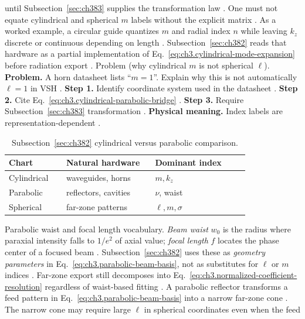 until Subsection~\ref{sec:ch383} supplies the transformation law \cite{hansen1988}. One must not equate cylindrical and
spherical \(m\) labels without the explicit matrix \cite{stratton1941}.
As a worked example, a circular guide quantizes \(m\) and radial index \(n\) while leaving \(k_{z}\) discrete or continuous depending on length
\cite{jackson1999}. Subsection~\ref{sec:ch382} reads that hardware as a partial implementation of
Eq.~\eqref{eq:ch3.cylindrical-mode-expansion} before radiation export \cite{stratton1941}.
Problem (why cylindrical \(m\) is not spherical \(\ell\)). \textbf{Problem.} A horn datasheet lists ``\(m=1\)''. Explain why this is not automatically \(\ell=1\) in VSH
\cite{harrington2001}.
\textbf{Step 1.} Identify coordinate system used in the datasheet \cite{stratton1941}.
\textbf{Step 2.} Cite Eq.~\eqref{eq:ch3.cylindrical-parabolic-bridge} \cite{hansen1988}.
\textbf{Step 3.} Require Subsection~\ref{sec:ch383} transformation \cite{harrington2001}.
\textbf{Physical meaning.} Index labels are representation-dependent \cite{jackson1999}.
\begin{table}[t]
\centering
\caption{Subsection~\ref{sec:ch382} cylindrical versus parabolic comparison.}
\label{tab:ch3.382-chart-comparison}
\small
\begin{tabular}{@{}p{0.22\linewidth}p{0.34\linewidth}p{0.36\linewidth}@{}}
\toprule
Chart & Natural hardware & Dominant index \\
\midrule
Cylindrical & waveguides, horns & \(m,k_{z}\) \\
Parabolic & reflectors, cavities & \(\nu\), waist \\
Spherical & far-zone patterns & \(\ell,m,\sigma\) \\
\bottomrule
\end{tabular}
\end{table}
Parabolic waist and focal length vocabulary. \emph{Beam waist} \(w_{0}\) is the radius where paraxial intensity falls to \(1/e^{2}\) of axial value; \emph{focal length} \(f\)
locates the phase center of a focused beam \cite{jackson1999}. Subsection~\ref{sec:ch382} uses these as \emph{geometry parameters}
in Eq.~\eqref{eq:ch3.parabolic-beam-basis}, not as substitutes for \(\ell\) or \(m\) indices \cite{stratton1941}. Far-zone export
still decomposes into Eq.~\eqref{eq:ch3.normalized-coefficient-resolution} regardless of waist-based fitting \cite{harrington2001}.
A parabolic reflector transforms a feed pattern in Eq.~\eqref{eq:ch3.parabolic-beam-basis} into a narrow far-zone cone
\cite{harrington2001}. The narrow cone may require large \(\ell\) in spherical coordinates even when the feed
